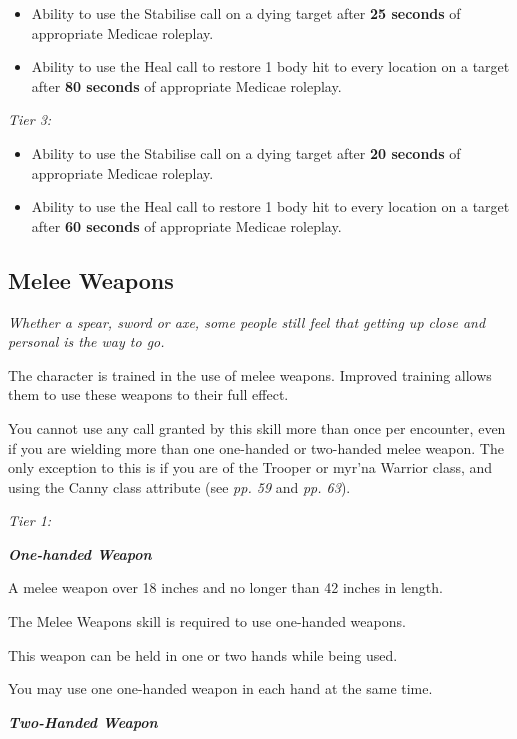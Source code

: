 \begin{itemize}
\item Ability to use the Stabilise call on a dying target after \textbf{25 seconds} of appropriate Medicae roleplay.

\item Ability to use the Heal call to restore 1 body hit to every location on a target after \textbf{80 seconds} of appropriate Medicae roleplay.

\end{itemize}
\textit{Tier 3:}

\begin{itemize}
\item Ability to use the Stabilise call on a dying target after \textbf{20 seconds} of appropriate Medicae roleplay.

\item Ability to use the Heal call to restore 1 body hit to every location on a target after \textbf{60 seconds} of appropriate Medicae roleplay.

\end{itemize}
\subsection{Melee Weapons}

\textit{Whether a spear, sword or axe, some people still feel that getting up close and personal is the way to go.}

The character is trained in the use of melee weapons. Improved training allows them to use these weapons to their full effect.

You cannot use any call granted by this skill more than once per encounter, even if you are wielding more than one one-handed or two-handed melee weapon. The only exception to this is if you are of the Trooper or myr'na Warrior class, and using the Canny class attribute (see \textit{pp. 59} and \textit{pp. 63}).

\textit{Tier 1:}

\textbf{\textit{One-handed Weapon}}

A melee weapon over 18 inches and no longer than 42 inches in length.

The Melee Weapons skill is required to use one-handed weapons.

This weapon can be held in one or two hands while being used.

You may use one one-handed weapon in each hand at the same time.

\textbf{\textit{Two-Handed Weapon}}


